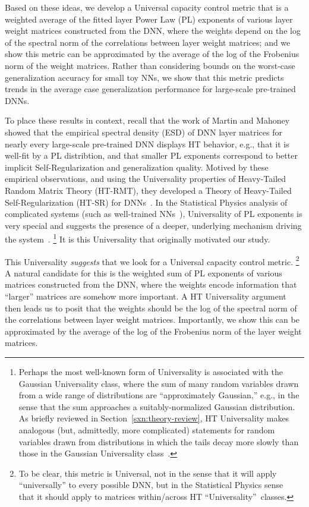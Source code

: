 Based on these ideas, we develop a Universal capacity control metric that is a weighted average of the fitted layer Power Law (PL) exponents of various layer weight matrices constructed from the DNN, where the weights depend on the log of the spectral norm of the correlations between layer weight matrices; and we show this metric can be approximated by the average of the log of the Frobenius norm of the weight matrices.
Rather than considering bounds on the worst-case generalization accuracy for small toy NNs, we show that this metric predicts trends in the average case generalization performance for large-scale pre-trained DNNs.

To place these results in context, recall that the work of Martin and Mahoney~\cite{MM18_TR} showed that the empirical spectral density (ESD) of DNN layer matrices for nearly every large-scale pre-trained DNN displays HT behavior, e.g., that it is well-fit by a PL distribtion, and that smaller PL exponents correspond to better implicit Self-Regularization and generalization quality.
Motived by these empirical observations, and using the Universality properties of Heavy-Tailed Random Matrix Theory (HT-RMT), they developed a Theory of Heavy-Tailed Self-Regularization (HT-SR) for DNNs~\cite{MM17_TR,MM18_TR}.
In the Statistical Physics analysis of complicated systems (such as well-trained NNs~\cite{EB01_BOOK,nishimori01}), Universality of PL exponents is very special and suggests the presence of a deeper, underlying mechanism driving the system~\cite{SornetteBook,BouchaudPotters03}.%
\footnote{Perhaps the most well-known form of Universality is associated with the Gaussian Universality class, where the sum of many random variables drawn from a wide range of distributions are ``approximately Gaussian,'' e.g., in the sense that the sum approaches a suitably-normalized Gaussian distribution.  As briefly reviewed in Section~\ref{sxn:theory-review}, HT Universality makes analogous (but, admittedly, more complicated) statements for random variables drawn from distributions in which the tails decay more slowly than those in the Gaussian Universality class~\cite{MM18_TR}.}
It is this Universality that originally motivated our study.

This Universality \emph{suggests} that we look for a Universal capacity control metric.%
\footnote{To be clear, this metric is Universal, not in the sense that it will apply ``universally'' to every possible DNN, but in the Statistical Physics sense~\cite{SornetteBook,BouchaudPotters03} that it should apply to matrices within/across HT ``Universality''~classes.}
A natural candidate for this is the weighted sum of PL exponents of various matrices constructed from the DNN, where the weights encode information that ``larger'' matrices are somehow more important.
A HT Universality argument then leads us to posit that the weights should be the log of the spectral norm of the correlations between layer weight matrices.
Importantly, we show this can be approximated by the average of the log of the Frobenius norm of the layer weight matrices.


